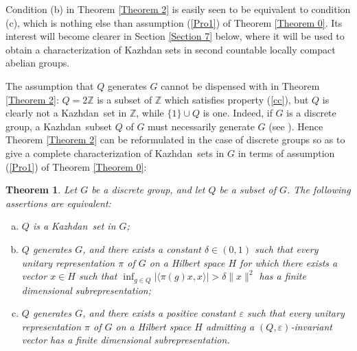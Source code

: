 \documentclass[11pt,english,a4paper]{smfart}
\numberwithin{equation}{section}
\newtheorem{theorem}{Theorem}[section]
\theoremstyle{definition}
\begin{document}
 Condition (b) in Theorem \ref{Theorem 2} is easily seen to be equivalent to condition (c), which is nothing else than assumption (\ref{Pro1}) of Theorem \ref{Theorem 0}. Its interest will become clearer in Section \ref{Section 7} below, where it will be used to obtain a characterization of Kazhdan sets in second countable locally compact abelian groups.
\par\smallskip
The assumption that ${Q}$ generates $G$ cannot be dispensed with in 
Theorem \ref{Theorem 2}: ${Q}=2{\ensuremath{\mathbb Z}}$ is a subset of ${\ensuremath{\mathbb Z}}$ which 
satisfies property (\ref{cc}), but ${Q}$ is clearly not a {Kazhdan}\ 
set in ${\ensuremath{\mathbb Z}}$, while $\{1\}\cup {Q}$ is one. Indeed, if $G$ is a discrete 
group, a {Kazhdan}\ subset ${Q}$ of $G$ must necessarily generate $G$ (see \cite[Prop.~1.3.2]{BdHV}). Hence
Theorem \ref{Theorem 2} can be reformulated in the  case of discrete groups so as to give a complete
characterization of {Kazhdan}\ sets in $G$ in terms of assumption (\ref{Pro1}) 
of Theorem \ref{Theorem 0}:
\begin{theorem}\label{Corollary 100}
 Let $G$ be a discrete group, and let ${Q}$ be a subset of $G$. The 
following assertions are equivalent:
\begin{enumerate}[(a)]
\item ${Q}$ is a {Kazhdan}\ set in $G$;\label{aaa}

\item ${Q}$ generates $G$, and there exists a constant $\delta \in (0,1)$ such that every unitary representation $\pi$ of $G$ on a Hilbert space $H$ for which there exists a vector $x\in H$ such that $\inf_{g\in{Q}}\left|{\ensuremath{{\langle {\pi(g)x},{x}\rangle}}}\right| > \delta\|x\|^2$ has a finite dimensional subrepresentation;\label{bbb}

\item ${Q}$ generates $G$, and there exists a positive constant $\varepsilon $ such that every unitary 
representation $\pi $ of $G$ on a Hilbert space $H$ admitting a 
$({Q},\varepsilon )$-invariant vector has a finite dimensional 
subrepresentation.\label{ccc}
\end{enumerate}
\end{theorem}
\end{document}
